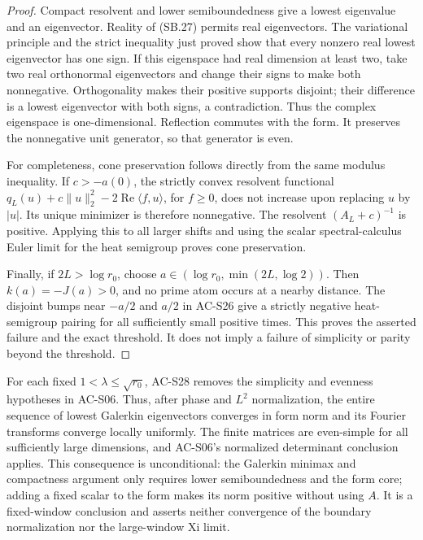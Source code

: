 \begin{proof}
Compact resolvent and lower semiboundedness give a lowest eigenvalue
and an eigenvector.  Reality of (SB.27) permits real eigenvectors.
The variational principle and the strict inequality just proved
show that every nonzero real lowest eigenvector has one sign.
If this eigenspace had real dimension at least two, take two real
orthonormal eigenvectors and change their signs to make both
nonnegative.  Orthogonality makes their positive supports disjoint;
their difference is a lowest eigenvector with both signs, a
contradiction.  Thus the complex eigenspace is one-dimensional.
Reflection commutes with the form.  It preserves the nonnegative
unit generator, so that generator is even.

For completeness, cone preservation follows directly from the same
modulus inequality.  If \(c>-a(0)\), the strictly convex resolvent
functional
\(q_L(u)+c\|u\|_2^2-2\operatorname{Re}\langle f,u\rangle\),
for \(f\geq0\), does not increase upon replacing \(u\) by \(|u|\).
Its unique minimizer is therefore nonnegative.  The resolvent
\((A_L+c)^{-1}\) is positive.  Applying this to all larger shifts
and using the scalar spectral-calculus Euler limit for the heat
semigroup proves cone preservation.

Finally, if \(2L>\log r_0\), choose
\(a\in(\log r_0,\min(2L,\log2))\).
Then \(k(a)=-J(a)>0\), and no prime atom occurs at a nearby
distance.  The disjoint bumps near \(-a/2\) and \(a/2\) in
AC-S26 give a strictly negative heat-semigroup pairing for all
sufficiently small positive times.  This proves the asserted
failure and the exact threshold.  It does not imply a failure of
simplicity or parity beyond the threshold.
\end{proof}

\begin{remark}
For each fixed \(1<\lambda\leq\sqrt{r_0}\), AC-S28 removes the
simplicity and evenness hypotheses in AC-S06.  Thus, after phase
and \(L^2\) normalization, the entire sequence of lowest Galerkin
eigenvectors converges in form norm and its Fourier transforms
converge locally uniformly.  The finite matrices are even-simple
for all sufficiently large dimensions, and AC-S06's normalized
determinant conclusion applies.  This consequence is unconditional:
the Galerkin minimax and compactness argument only requires lower
semiboundedness and the form core; adding a fixed scalar to the
form makes its norm positive without using \(A\).
It is a fixed-window conclusion and asserts neither convergence
of the boundary normalization nor the large-window Xi limit.
\end{remark}

